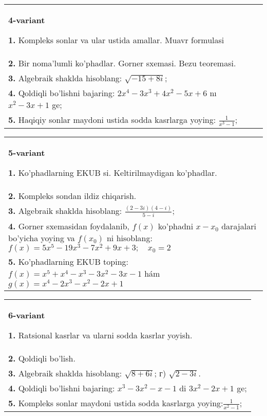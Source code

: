 \documentclass{article}
\begin{document}
\begin{tabular}{m{17cm}}
\textbf{4-variant}
\newline

\textbf{1.} Kompleks sonlar va ular ustida amallar. Muavr formulasi  \\
\textbf{2.} Bir noma’lumli ko’phadlar. Gorner sxemasi. Bezu teoremasi.  \\
\textbf{3.} Algebraik shaklda hisoblang: $\sqrt{-15+8 i}$; \\
\textbf{4.} Qoldiqli bo’lishni bajaring: $2 x^4-3 x^3+4 x^2-5 x+6$ nı $x^2-3 x+1$ ge; \\
\textbf{5.} Haqiqiy sonlar maydoni ustida sodda kasrlarga yoying:  $\frac{1}{x^3-1}$; \\

\end{tabular}
\vspace{1cm}


\begin{tabular}{m{17cm}}
\textbf{5-variant}
\newline

\textbf{1.} Ko’phadlarning EKUB si. Keltirilmaydigan ko’phadlar. \\
\textbf{2.} Kompleks sondan ildiz chiqarish. \\
\textbf{3.} Algebraik shaklda hisoblang: $\frac{(2-3 i)(4-i)}{5-i}$; \\
\textbf{4.} Gorner sxemasidan foydalanib, $f(x)$ ko’phadni $x-x_0$ darajalari bo’yicha yoying va $f\left(x_0\right)$ ni hisoblang: $f(x)=5 x^5-19 x^3-7 x^2+9 x+3 ; \quad x_0=2$ \\
\textbf{5.} Ko’phadlarning EKUB toping: $f(x)=x^5+x^4-x^3-3 x^2-3 x-1$ hám $g(x)=x^4-2 x^3-x^2-2 x+1$ \\

\end{tabular}
\vspace{1cm}


\begin{tabular}{m{17cm}}
\textbf{6-variant}
\newline

\textbf{1.} Ratsional kasrlar va ularni sodda kasrlar yoyish. \\
\textbf{2.} Qoldiqli bo’lish.  \\
\textbf{3.} Algebraik shaklda hisoblang: $\sqrt{8+6 i}$; г) $\sqrt{2-3 i}$. \\
\textbf{4.} Qoldiqli bo’lishni bajaring: $x^3-3 x^2-x-1$ di $3 x^2-2 x+1$ ge; \\
\textbf{5.} Kompleks sonlar maydoni ustida sodda kasrlarga yoying:$\frac{1}{x^2-1}$; \\

\end{tabular}
\vspace{1cm}
\end{document}
